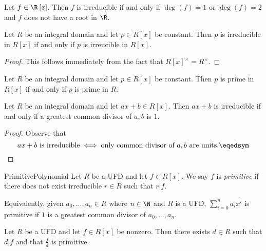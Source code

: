 \documentclass[pmath347]{subfiles}
\begin{document}
    \begin{cor}{}
        Let $f\in\R\left[ x \right]$. Then $f$ is irreducible if and only if $\deg\left( f \right) = 1$ or $\deg\left( f \right) =2 $ and $f$ does not have a root in $\R$.
    \end{cor}	

    \begin{prop}{}
        Let $R$ be an integral domain and let $p\in R\left[ x \right]$ be constant. Then $p$ is irreducible in $R\left[ x \right]$ if and only if $p$ is irreucible in $R\left[ x \right]$.
    \end{prop}

    \begin{proof}
        This follows immediately from the fact that $R\left[ x \right] ^\times = R^\times$.
    \end{proof}

    \begin{prop}{}
        Let $R$ be an integral domain and let $p\in R\left[ x \right] $ be constant. Then $p$ is prime in $R\left[ x \right]$ if and only if $p$ is prime in $R$.
    \end{prop}

    \begin{prop}{}
        Let $R$ be an integral domain and let $ax+b\in R\left[ x \right]$. Then $ax+b$ is irreducible if and only if a greatest common divisor of $a,b$ is $1$.
    \end{prop}

    \begin{proof}
        Observe that
        \begin{equation*}
            ax+b\text{ is irreducible}\iff\text{only common divisor of $a,b$ are units}. \eqedsym
        \end{equation*}
    \end{proof}

    \begin{definition}{Primitive}{Polynomial}
        Let $R$ be a UFD and let $f\in R\left[ x \right]$. We say $f$ is \emph{primitive} if there does not exist irreducible $r\in R$ such that $r|f$.
    \end{definition}

    \np Equivalently, given $a_0,\ldots,a_n\in R$ where $n\in\N$ and $R$ is a UFD, $\sum^{n}_{i=0} a_ix^i$ is primitive if $1$ is a greatest common divisor of $a_0,\ldots,a_n$.

    \begin{prop}{}
        Let $R$ be a UFD and let $f\in R\left[ x \right]$ be nonzero. Then there exists $d\in R$ such that $d|f$ and that $\frac{f}{d}$ is primitive.
    \end{prop}
\end{document}
